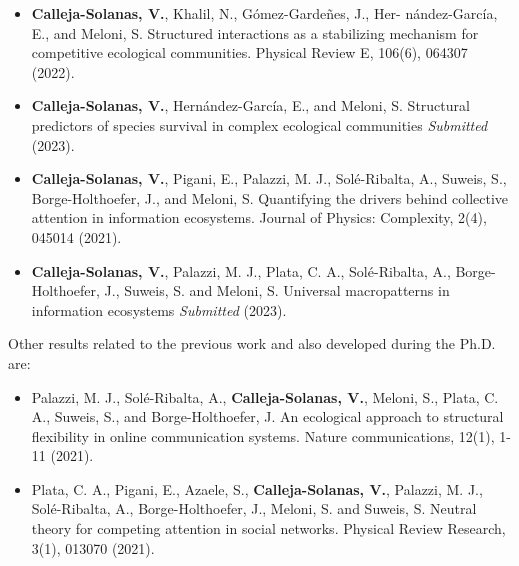 \begin{itemize}
    \item [\cite{calleja2022structured}] \textbf{Calleja-Solanas, V.}, Khalil, N., Gómez-Gardeñes, J., Her- nández-García, E., and Meloni, S. Structured interactions as a stabilizing mechanism for competitive ecological communities. Physical Review E, 106(6), 064307 (2022).
    
    \item [\cite{calleja2023predictors}] \textbf{Calleja-Solanas, V.}, Hernández-García, E., and Meloni, S. Structural predictors of species survival in complex ecological communities  \textit{Submitted} (2023).

    \item [\cite{calleja2021quantifying}] \textbf{Calleja-Solanas, V.}, Pigani, E., Palazzi, M. J., Solé-Ribalta, A., Suweis, S., Borge-Holthoefer, J., and Meloni, S. Quantifying the drivers behind collective attention in information ecosystems. Journal of Physics: Complexity, 2(4), 045014 (2021).

    \item [\cite{calleja2023macropatterns}]  \textbf{Calleja-Solanas, V.}, Palazzi, M. J., Plata, C. A., Solé-Ribalta, A., Borge-Holthoefer, J.,  Suweis, S. and Meloni, S. Universal macropatterns in information ecosystems \textit{Submitted} (2023).
\end{itemize}

Other results related to the previous work and also developed during the Ph.D. are:
\begin{itemize}
    \item [\cite{palazzi2021ecological}] Palazzi, M. J., Solé-Ribalta, A., \textbf{Calleja-Solanas, V.}, Meloni, S., Plata, C. A., Suweis, S., and Borge-Holthoefer, J.  An ecological approach to structural flexibility in online communication systems. Nature communications, 12(1), 1-11 (2021).
    
    \item [\cite{plata2021neutral}] Plata, C. A., Pigani, E., Azaele, S., \textbf{Calleja-Solanas, V.}, Palazzi, M. J., Solé-Ribalta, A., Borge-Holthoefer, J., Meloni, S. and Suweis, S.  Neutral theory for competing attention in social networks. Physical Review Research, 3(1), 013070 (2021).
\end{itemize}


